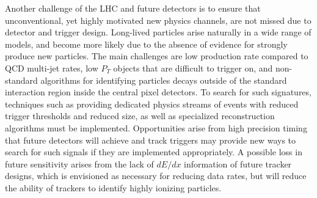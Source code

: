 \noindent Another challenge of the LHC and future detectors is to ensure that unconventional, yet highly motivated new physics channels, are not missed due to detector and trigger design.  Long-lived particles arise naturally in a wide range of models, and become more likely due to the absence of evidence for strongly produce new particles. The main challenges are low production rate compared to QCD multi-jet rates, low $P_T$ objects that are difficult to trigger on, and non-standard algorithms for identifying particles decays outside of the standard interaction region inside the central pixel detectors.  To search for such signatures, techniques such as providing dedicated physics streams of events with reduced trigger thresholds and reduced size, as well as specialized reconstruction algorithms must be implemented.  Opportunities arise from high precision timing that future detectors will achieve and track triggers may provide new ways to search for such signals if they are implemented appropriately.  A possible loss in future sensitivity arises from the lack of $dE/dx$ information of future tracker designs, which is envisioned as necessary for reducing data rates, but will reduce the ability of trackers to identify highly ionizing particles. 



\